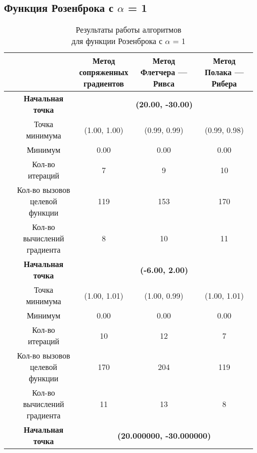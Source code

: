             \subsection{Функция Розенброка с $\alpha$ = 1}

\begin{table}[H]
        \centering
        \vspace*{-1.5em}
        \caption{Результаты работы алгоритмов\\для функции Розенброка с $\alpha$ = 1}
        \footnotesize
        \begin{tabular}{|c|c|c|c|c|}
        \hline
        & &\makecell{Метод\\сопряженных\\градиентов} &\makecell{Метод\\Флетчера --- Ривса} &\makecell{Метод\\Полака --- Рибера} \\
        \hline
	\multirow{10}{*}{\rotatebox[origin=c]{90}{$\varepsilon = 0.01$}}&\textbf{Начальная точка} &\multicolumn{3}{c|}{\textbf{(20.00, -30.00)}}\\
	\cline{2-5}
	&Точка минимума &(1.00, 1.00) &(0.99, 0.99) &(0.99, 0.98) \\ 
	\cline{2-5}
	&Минимум &0.00 &0.00 &0.00 \\ 
	\cline{2-5}
	&Кол-во итераций &7 &9 &10 \\ 
	\cline{2-5}
	&\makecell{Кол-во вызовов\\целевой функции} &119 &153 &170 \\ 
	\cline{2-5}
	&\makecell{Кол-во вычислений\\градиента} &8 &10 &11 \\ 
	\cline{2-5}
\cline{2-5}&\textbf{Начальная точка} &\multicolumn{3}{c|}{\textbf{(-6.00, 2.00)}}\\
	\cline{2-5}
	&Точка минимума &(1.00, 1.01) &(1.00, 0.99) &(1.00, 1.01) \\ 
	\cline{2-5}
	&Минимум &0.00 &0.00 &0.00 \\ 
	\cline{2-5}
	&Кол-во итераций &10 &12 &7 \\ 
	\cline{2-5}
	&\makecell{Кол-во вызовов\\целевой функции} &170 &204 &119 \\ 
	\cline{2-5}
	&\makecell{Кол-во вычислений\\градиента} &11 &13 &8 \\ 
	\cline{2-5}
	\hline
	\multirow{10}{*}{\rotatebox[origin=c]{90}{$\varepsilon = 1e-06$}}&\textbf{Начальная точка} &\multicolumn{3}{c|}{\textbf{(20.000000, -30.000000)}}\\

\end{tabular}
\end{table}
